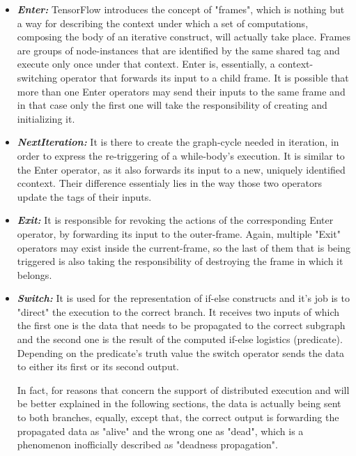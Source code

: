 \documentclass[ack,preface]{dithesis}
\begin{document}
    \begin{itemize}

    \item \textit{\textbf{Enter:}} TensorFlow introduces the concept of "frames", which is nothing but a way for describing the context under which a set of computations, composing the body of an iterative construct, will actually take place. Frames are groups of node-instances that are identified by the same shared tag and execute only once under that context. Enter is, essentially, a context-switching operator that forwards its input to a child frame. It is possible that more than one Enter operators may send their inputs to the same frame and in that case only the first one will take the responsibility of creating and initializing it.

    \item \textit{\textbf{NextIteration:}} It is there to create the graph-cycle needed in iteration, in order to express the re-triggering of a while-body's execution. It is similar to the Enter operator, as it also forwards its input to a new, uniquely identified ccontext. Their difference essentialy lies in the way those two operators update the tags of their inputs.

    \item \textit{\textbf{Exit:}} It  is responsible for revoking the actions of the corresponding Enter operator, by forwarding its input to the outer-frame.
 Again, multiple "Exit" operators may exist inside the current-frame, so the last of them that is being triggered is also taking the responsibility of destroying the frame in which it belongs.

    \item \textit{\textbf{Switch:}} It is used for the representation of if-else constructs and it's job is to "direct" the execution to the correct branch. It receives two inputs of which the first one is the data that needs to be propagated to the correct subgraph and the second one is the result of the computed if-else logistics  (predicate). Depending on the predicate's truth value the switch operator sends the data to either its first or its second output. 

In fact, for reasons that concern the support of distributed execution and will be better explained in the following sections,  the data is actually being sent to both branches, equally, 
except that, the correct output is forwarding the propagated data as "alive" and the wrong one as "dead", which is a phenomenon inofficially described as "deadness propagation".


\end{itemize}
\end{document}
